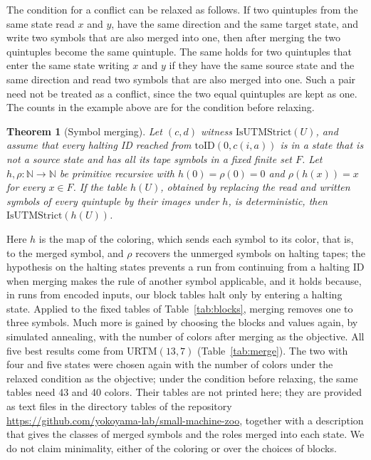 \documentclass{article}
\newtheorem{theorem}{Theorem}
\theoremstyle{definition}
\theoremstyle{remark}
\begin{document}
The condition for a conflict can be relaxed as follows. If two quintuples from the same state read $x$ and $y$, have the same direction and the same target state, and write two symbols that are also merged into one, then after merging the two quintuples become the same quintuple. The same holds for two quintuples that enter the same state writing $x$ and $y$ if they have the same source state and the same direction and read two symbols that are also merged into one. Such a pair need not be treated as a conflict, since the two equal quintuples are kept as one. The counts in the example above are for the condition before relaxing.


\begin{theorem}[Symbol merging]
\label{thm:merge}
Let $(c,d)$ witness $\mathrm{IsUTMStrict}(U)$, and assume that every halting ID reached from $\mathrm{toID}(0,c(i,a))$ is in a state that is not a source state and has all its tape symbols in a fixed finite set $F$.
Let $h,\rho:\mathbb{N}\to\mathbb{N}$ be primitive recursive with $h(0)=\rho(0)=0$ and $\rho(h(x))=x$ for every $x\in F$.
If the table $h(U)$, obtained by replacing the read and written symbols of every quintuple by their images under $h$, is deterministic, then $\mathrm{IsUTMStrict}(h(U))$.
\end{theorem}

Here $h$ is the map of the coloring, which sends each symbol to its color, that is, to the merged symbol, and $\rho$ recovers the unmerged symbols on halting tapes; the hypothesis on the halting states prevents a run from continuing from a halting ID when merging makes the rule of another symbol applicable, and it holds because, in runs from encoded inputs, our block tables halt only by entering a halting state.
Applied to the fixed tables of Table~\ref{tab:blocks}, merging removes one to three symbols.
Much more is gained by choosing the blocks and values again, by simulated annealing, with the number of colors after merging as the objective.
All five best results come from URTM$(13,7)$ (Table~\ref{tab:merge}). The two with four and five states were chosen again with the number of colors under the relaxed condition as the objective; under the condition before relaxing, the same tables need 43 and 40 colors.
Their tables are not printed here; they are provided as text files in the directory tables of the repository \url{https://github.com/yokoyama-lab/small-machine-zoo}, together with a description that gives the classes of merged symbols and the roles merged into each state.
We do not claim minimality, either of the coloring or over the choices of blocks.
\end{document}
